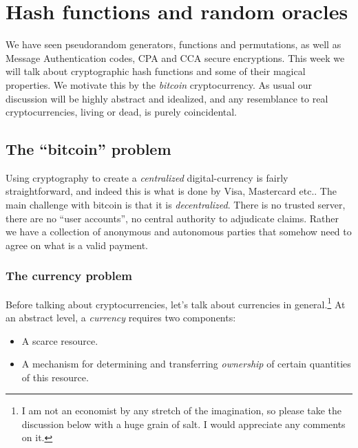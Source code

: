 \chapter{Hash functions and random
oracles}\label{Hash-functions-and-random}

We have seen pseudorandom generators, functions and permutations, as
well as Message Authentication codes, CPA and CCA secure encryptions.
This week we will talk about cryptographic hash functions and some of
their magical properties. We motivate this by the \emph{bitcoin}
cryptocurrency. As usual our discussion will be highly abstract and
idealized, and any resemblance to real cryptocurrencies, living or dead,
is purely coincidental.

\section{The ``bitcoin'' problem}\label{The-bitcoin-problem}

Using cryptography to create a \emph{centralized} digital-currency is
fairly straightforward, and indeed this is what is done by Visa,
Mastercard etc.. The main challenge with bitcoin is that it is
\emph{decentralized}. There is no trusted server, there are no ``user
accounts'', no central authority to adjudicate claims. Rather we have a
collection of anonymous and autonomous parties that somehow need to
agree on what is a valid payment.

\subsection{The currency problem}\label{The-currency-problem}

Before talking about cryptocurrencies, let's talk about currencies in
general.\footnote{I am not an economist by any stretch of the
  imagination, so please take the discussion below with a huge grain of
  salt. I would appreciate any comments on it.} At an abstract level, a
\emph{currency} requires two components:

\begin{itemize}
\item
  A scarce resource.
\item
  A mechanism for determining and transferring \emph{ownership} of
  certain quantities of this resource.
\end{itemize}


